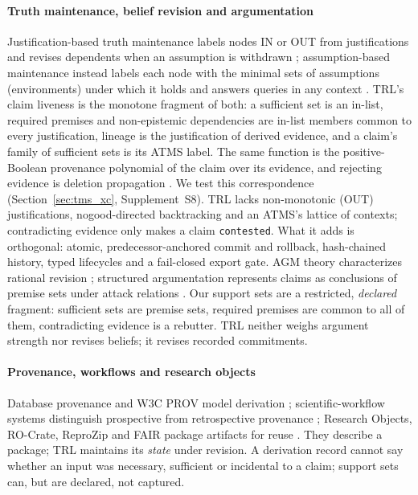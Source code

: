 \documentclass[journal]{IEEEtran}
\newcommand{\suppl}[1]{Supplement~#1}
\begin{document}
\paragraph{Truth maintenance, belief revision and argumentation}
Justification-based truth maintenance labels nodes IN or OUT from justifications and revises dependents when an assumption is withdrawn \cite{doyle1979tms}; assumption-based maintenance instead labels each node with the minimal sets of assumptions (environments) under which it holds and answers queries in any context \cite{dekleer1986atms}. TRL's claim liveness is the monotone fragment of both: a sufficient set is an in-list, required premises and non-epistemic dependencies are in-list members common to every justification, lineage is the justification of derived evidence, and a claim's family of sufficient sets is its ATMS label. The same function is the positive-Boolean provenance polynomial of the claim over its evidence, and rejecting evidence is deletion propagation \cite{buneman2001provenance,green2007provenance}. We test this correspondence (Section~\ref{sec:tms_xc}, \suppl{S8}). TRL lacks non-monotonic (OUT) justifications, nogood-directed backtracking and an ATMS's lattice of contexts; contradicting evidence only makes a claim \texttt{contested}. What it adds is orthogonal: atomic, predecessor-anchored commit and rollback, hash-chained history, typed lifecycles and a fail-closed export gate. AGM theory characterizes rational revision \cite{alchourron1985agm}; structured argumentation represents claims as conclusions of premise sets under attack relations \cite{toulmin1958uses,dung1995acceptability,modgil2014aspic}. Our support sets are a restricted, \emph{declared} fragment: sufficient sets are premise sets, required premises are common to all of them, contradicting evidence is a rebutter. TRL neither weighs argument strength nor revises beliefs; it revises recorded commitments.

\paragraph{Provenance, workflows and research objects}
Database provenance and W3C PROV model derivation \cite{buneman2001provenance,green2007provenance,w3c2013prov}; scientific-workflow systems distinguish prospective from retrospective provenance \cite{davidson2008provenance,simmhan2005survey}; Research Objects, RO-Crate, ReproZip and FAIR package artifacts for reuse \cite{bechhofer2013linked,soilandreyes2022rocrate,chirigati2016reprozip,wilkinson2016fair}. They describe a package; TRL maintains its \emph{state} under revision. A derivation record cannot say whether an input was necessary, sufficient or incidental to a claim; support sets can, but are declared, not captured.
\end{document}
